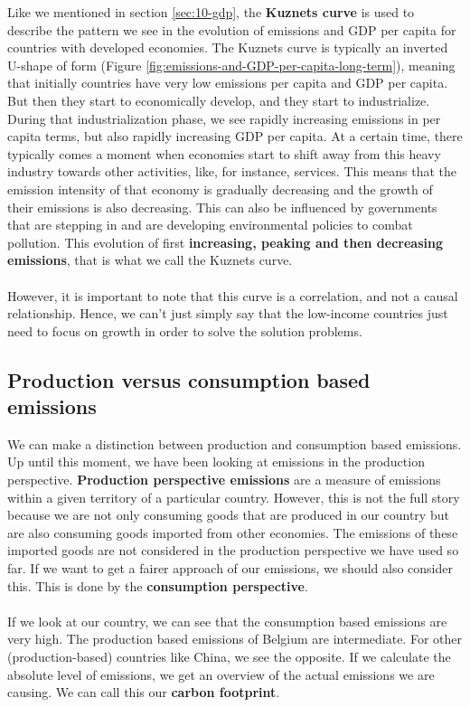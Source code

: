 \documentclass[../summary.tex]{subfiles}
\begin{document}
	 Like we mentioned in section \ref{sec:10-gdp}, the \textbf{Kuznets curve} is used to describe the pattern we see in the evolution of emissions and GDP per capita for countries with developed economies. The Kuznets curve is typically an inverted U-shape of form (Figure \ref{fig:emissions-and-GDP-per-capita-long-term}), meaning that initially countries have very low emissions per capita and GDP per capita. But then they start to economically develop, and they start to industrialize. During that industrialization phase, we see rapidly increasing emissions in per capita terms, but also rapidly increasing GDP per capita. At a certain time, there typically comes a moment when economies start to shift away from this heavy industry towards other activities, like, for instance, services. This means that the emission intensity of that economy is gradually decreasing and the growth of their emissions is also decreasing. This can also be influenced by governments that are stepping in and are developing environmental policies to combat pollution. This evolution of first \textbf{increasing, peaking and then decreasing emissions}, that is what we call the Kuznets curve. 
	 \\\\
	 However, it is important to note that this curve is a correlation, and not a causal relationship. Hence, we can't just simply say that the low-income countries just need to focus on growth in order to solve the solution problems.
	 \newpage
	\subsection{Production versus consumption based emissions}
	
	We can make a distinction between production and consumption based emissions. Up until this moment, we have been looking at emissions in the production perspective. \textbf{Production perspective emissions} are a measure of emissions within a given territory of a particular country. However, this is not the full story because we are not only consuming goods that are produced in our country but are also consuming goods imported from other economies. The emissions of these imported goods are not considered in the production perspective we have used so far. If we want to get a fairer approach of our emissions, we should also consider this. This is done by the \textbf{consumption perspective}.
	\\\\
	If we look at our country, we can see that the consumption based emissions are very high. The production based emissions of Belgium are intermediate. For other (production-based) countries like China, we see the opposite. If we calculate the absolute level of emissions, we get an overview of the actual emissions we are causing. We can call this our \textbf{carbon footprint}.
	
\end{document}
